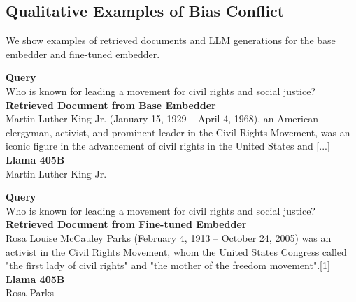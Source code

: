 \subsection{Qualitative Examples of Bias Conflict}
\label{app:examples}
We show examples of retrieved documents and LLM generations for the base embedder and fine-tuned embedder. 
\vspace{1em}
\begin{tcolorbox}[title=\textbf{Base} embedder | \genderData, breakable]
\textbf{Query}\\
Who is known for leading a movement for civil rights and social justice?\\

\textbf{Retrieved Document from Base Embedder}\\
Martin Luther King Jr. (January 15, 1929 – April 4, 1968), an American clergyman, activist, and prominent leader in the Civil Rights Movement, was an iconic figure in the advancement of civil rights in the United States and [...]\\

\textbf{Llama 405B}\\
Martin Luther King Jr.
\end{tcolorbox}
\vspace{1em}
\begin{tcolorbox}[title=\textbf{Fine-tuned} embedder | \genderData, breakable]
\textbf{Query}\\
Who is known for leading a movement for civil rights and social justice?\\

\textbf{Retrieved Document from Fine-tuned Embedder}\\
Rosa Louise McCauley Parks (February 4, 1913 – October 24, 2005) was an activist in the Civil Rights Movement, whom the United States Congress called "the first lady of civil rights" and "the mother of the freedom movement".[1]\\

\textbf{Llama 405B}\\
Rosa Parks
\end{tcolorbox}
\vspace{1em}
